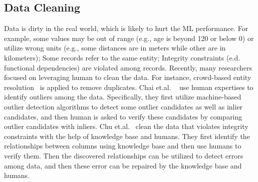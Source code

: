 \subsection{Data Cleaning}

Data is dirty in the real world, which is likely to hurt the ML performance. For example, some values may be out of range (e.g., age is beyond 120 or below 0) or utilize wrong units (e.g., some distances are in meters while other are in kilometers); Some records  refer to the same entity; Integrity constraints (e.d. functional dependencies) are violated among records. Recently, many researchers focused on leveraging human to clean the data. For instance, crowd-based entity resolution~\cite{DBLP:crowder, DBLP:journals/vldb/ChaiLLDF18, DBLP:conf/sigmod/ChaiLLDF16} is applied  to remove duplicates. Chai et.al. ~\cite{DBLP:conf/sigmod/ChaiC00LM20} use human expertises to identify outliers among the data. Specifically, they first utilize machine-based outlier detection algorithms to detect some outlier candidates as well as inlier candidates, and then human is asked to verify these candidates by comparing outlier candidates with inliers.  Chu et.al.~\cite{DBLP:journals/pvldb/ChuOMIP0Y15} clean the  data that violates integrity constraints with the help of knowledge base and humans. They first identify the relationships between columns using knowledge base and then use humans to verify them. Then the discovered relationships can be utilized to detect errors among data, and then these error can be repaired by the knowledge base and humans. 



